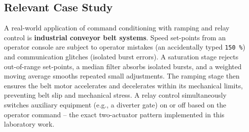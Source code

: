 \subsection{Relevant Case Study}
A real-world application of command conditioning with ramping and relay control is
\textbf{industrial conveyor belt systems}. Speed set-points from an operator console
are subject to operator mistakes (an accidentally typed \texttt{150\,\%}) and
communication glitches (isolated burst errors). A saturation stage rejects out-of-range
set-points, a median filter absorbs isolated bursts, and a weighted moving average
smooths repeated small adjustments. The ramping stage then ensures the belt motor
accelerates and decelerates within its mechanical limits, preventing belt slip and
mechanical stress. A relay control simultaneously switches auxiliary equipment
(e.g., a diverter gate) on or off based on the operator command -- the exact two-actuator
pattern implemented in this laboratory work.
